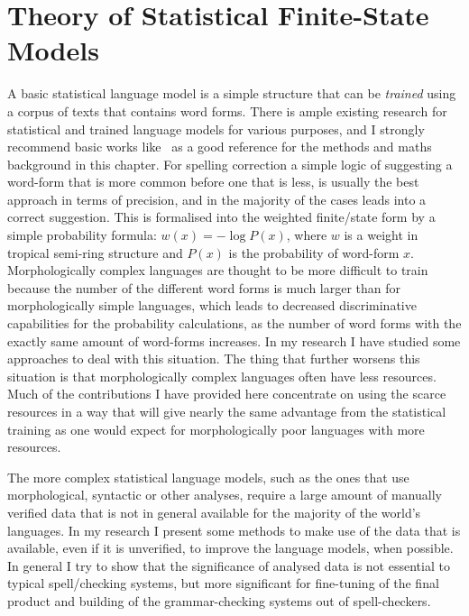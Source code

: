 \documentclass[officiallayout]{unihelcompling}
\begin{document}
\section{Theory of Statistical Finite-State Models}
\label{sec:statistical}

A basic statistical language model is a simple structure that can be
\emph{trained} using a corpus of texts that contains word forms. There is ample
existing research for statistical and trained language models for various
purposes, and I strongly recommend basic works
like~\citet{manning1999foundations} as a good reference for the methods and
maths background in this chapter.  For spelling correction a simple logic of
suggesting a word-form that is more common before one that is less, is usually
the best approach in terms of precision, and in the majority of the cases leads
into a correct suggestion. This is formalised into the weighted finite\-/state
form by a simple probability formula: $w(x) = -\log P(x)$, where $w$ is a
weight in tropical semi-ring structure and $P(x)$ is the probability of
word-form $x$.  Morphologically complex languages are thought to be more
difficult to train because the number of the different word forms is much
larger than for morphologically simple languages, which leads to decreased
discriminative capabilities for the probability calculations, as the number of
word forms with the exactly same amount of word-forms increases. In my research
I have studied some approaches to deal with this situation. The thing that
further worsens this situation is that morphologically complex languages often
have less resources.  Much of the contributions I have provided here
concentrate on using the scarce resources in a way that will give nearly the
same advantage from the statistical training as one would expect for
morphologically poor languages with more resources.

The more complex statistical language models, such as the ones that use
morphological, syntactic or other analyses, require a large amount of manually
verified data that is not in general available for the majority of the world's
languages. In my research I present some methods to make use of the data that
is available, even if it is unverified, to improve the language models, when
possible. In general I try to show that the significance of analysed data is
not essential to typical spell\-/checking systems, but more significant for
fine-tuning of the final product and building of the grammar-checking systems
out of spell-checkers.
\end{document}
